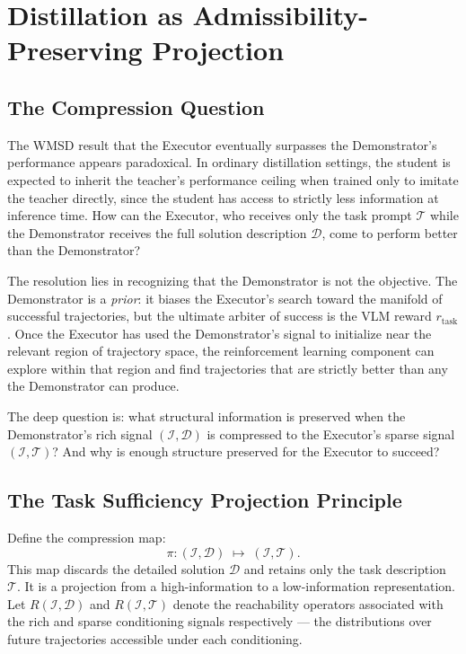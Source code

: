 \documentclass[12pt, a4paper]{article}
\theoremstyle{plain}
\theoremstyle{definition}
\theoremstyle{remark}
\begin{document}
\section{Distillation as Admissibility-Preserving Projection}

\subsection{The Compression Question}

The WMSD result that the Executor eventually surpasses the Demonstrator's
performance appears paradoxical. In ordinary distillation settings, the
student is expected to inherit the teacher's performance ceiling when trained
only to imitate the teacher directly, since the student has access to strictly
less information at inference time. How can the Executor, who receives only the
task prompt $\mathcal{T}$ while the Demonstrator receives the full solution
description $\mathcal{D}$, come to perform better than the Demonstrator?

The resolution lies in recognizing that the Demonstrator is not the objective.
The Demonstrator is a \emph{prior}: it biases the Executor's search toward the
manifold of successful trajectories, but the ultimate arbiter of success is the
VLM reward $r_{\mathrm{task}}$. Once the Executor has used the Demonstrator's
signal to initialize near the relevant region of trajectory space, the
reinforcement learning component can explore within that region and find
trajectories that are strictly better than any the Demonstrator can produce.

The deep question is: what structural information is preserved when the
Demonstrator's rich signal $(\mathcal{I}, \mathcal{D})$ is compressed to the
Executor's sparse signal $(\mathcal{I}, \mathcal{T})$? And why is enough
structure preserved for the Executor to succeed?

\subsection{The Task Sufficiency Projection Principle}

Define the compression map:
\begin{equation}
  \pi : (\mathcal{I}, \mathcal{D}) \;\mapsto\; (\mathcal{I}, \mathcal{T}).
\end{equation}
This map discards the detailed solution $\mathcal{D}$ and retains only the
task description $\mathcal{T}$. It is a projection from a high-information to
a low-information representation. Let $R(\mathcal{I}, \mathcal{D})$ and
$R(\mathcal{I}, \mathcal{T})$ denote the reachability operators associated
with the rich and sparse conditioning signals respectively --- the distributions
over future trajectories accessible under each conditioning.
\end{document}

